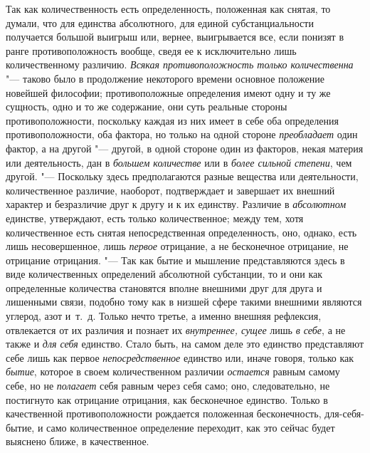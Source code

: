 \label{bkm:bm69a}Так как количественность есть определенность, положенная как снятая, то
думали, что для единства абсолютного, для единой субстанциальности
получается большой выигрыш или, вернее, выигрывается все, если понизят в
ранге противоположность вообще, сведя ее к исключительно лишь
количественному различию. {\em Всякая противоположность
только количественна} "--- таково было в продолжение некоторого времени
основное положение новейшей
философии; противоположные
определения имеют одну и ту же сущность, одно и то же содержание, они суть
реальные стороны противоположности, поскольку каждая из них имеет в себе
оба определения противоположности, оба фактора, но только на одной стороне
{\em преобладает} один фактор, а на другой "--- другой, в
одной стороне один из факторов, некая материя или деятельность, дан в
{\em большем количестве} или в
{\em более сильной степени}, чем другой. "--- Поскольку
здесь предполагаются разные вещества или деятельности, количественное
различие, наоборот, подтверждает и завершает их внешний характер и
безразличие друг к другу и к их единству. Различие в
{\em абсолютном} единстве, утверждают, есть только
количественное; между тем, хотя количественное есть снятая непосредственная
определенность, оно, однако, есть лишь несовершенное, лишь
{\em первое} отрицание, а не бесконечное отрицание, не
отрицание отрицания. "--- Так как бытие и мышление представляются здесь в виде
количественных определений абсолютной субстанции, то и они как определенные
количества становятся вполне внешними друг для друга и лишенными связи,
подобно тому как в низшей сфере такими внешними являются углерод, азот
и~т.~д. Только нечто третье, а именно внешняя рефлексия, отвлекается от их
различия и познает их {\em внутреннее, сущее} лишь
{\em в себе}, а не также и {\em для
себя} единство. Стало быть, на самом деле это единство представляют себе
лишь как первое {\em непосредственное} единство или,
иначе говоря, только как {\em бытие}, которое в своем
количественном различии {\em остается} равным самому
себе, но не {\em полагает} себя равным через себя само;
оно, следовательно, не постигнуто как отрицание отрицания, как бесконечное
единство. Только в качественной противоположности рождается положенная
бесконечность, для-себя-бытие, и само количественное определение переходит,
как это сейчас будет выяснено ближе, в качественное.

\bigskip

